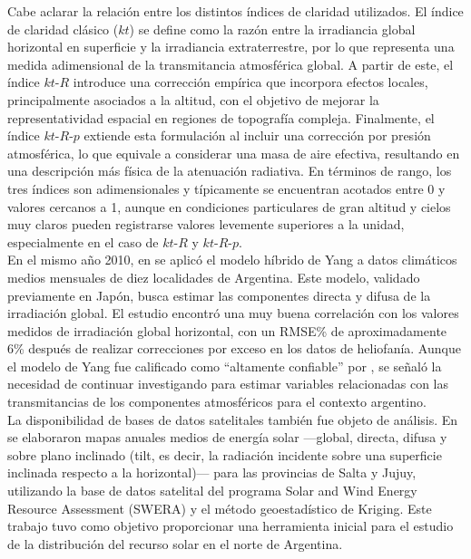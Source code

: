 Cabe aclarar la relación entre los distintos índices de claridad utilizados. El índice de claridad clásico ($kt$) se define como la razón entre la irradiancia global horizontal en superficie y la irradiancia extraterrestre, por lo que representa una medida adimensional de la transmitancia atmosférica global. A partir de este, el índice $kt\text{-}R$ introduce una corrección empírica que incorpora efectos locales, principalmente asociados a la altitud, con el objetivo de mejorar la representatividad espacial en regiones de topografía compleja. Finalmente, el índice $kt\text{-}R\text{-}p$ extiende esta formulación al incluir una corrección por presión atmosférica, lo que equivale a considerar una masa de aire efectiva, resultando en una descripción más física de la atenuación radiativa. En términos de rango, los tres índices son adimensionales y típicamente se encuentran acotados entre 0 y valores cercanos a 1, aunque en condiciones particulares de gran altitud y cielos muy claros pueden registrarse valores levemente superiores a la unidad, especialmente en el caso de $kt\text{-}R$ y $kt\text{-}R\text{-}p$.\\

En el mismo año 2010, en \cite{Salazar2010b} se aplicó el modelo híbrido de Yang a datos climáticos medios mensuales de diez localidades de Argentina. Este modelo, validado previamente en Japón, busca estimar las componentes directa y difusa de la irradiación global. El estudio encontró una muy buena correlación con los valores medidos de irradiación global horizontal, con un RMSE\% de aproximadamente 6\% después de realizar correcciones por exceso en los datos de heliofanía. Aunque el modelo de Yang fue calificado como ``altamente confiable'' por \cite{Gueymard2003}, se señaló la necesidad de continuar investigando para estimar variables relacionadas con las transmitancias de los componentes atmosféricos para el contexto argentino.\\

La disponibilidad de bases de datos satelitales también fue objeto de análisis. En \cite{Laspiur2013} se elaboraron mapas anuales medios de energía solar —global, directa, difusa y sobre plano inclinado (tilt, es decir, la radiación incidente sobre una superficie inclinada respecto a la horizontal)— para las provincias de Salta y Jujuy, utilizando la base de datos satelital del programa Solar and Wind Energy Resource Assessment (SWERA) \citep{OEDI} y el método geoestadístico de Kriging. Este trabajo tuvo como objetivo proporcionar una herramienta inicial para el estudio de la distribución del recurso solar en el norte de Argentina.\\

